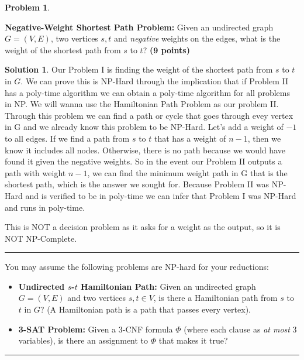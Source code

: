\documentclass{article}
\theoremstyle{definition}
\newtheorem{problem}{Problem}
\def\fline{\rule{0.75\linewidth}{0.5pt}}
\newcommand{\finishline}{\begin{center}\fline\end{center}}
\newtheorem*{solution*}{Solution}
\newenvironment{solution}{\begin{solution*}}{{\finishline} \end{solution*}}
\newcommand{\grade}[1]{\hfill{\textbf{($\mathbf{#1}$ points)}}}
\begin{document}
\begin{problem}
\begin{enumerate}[label=(\alph*)]
	 \item \textbf{Negative-Weight Shortest Path Problem:} Given an undirected graph $G=(V,E)$, two vertices $s,t$ and \emph{negative} weights on the edges, what is the weight of the shortest path from $s$ to $t$? \grade{9}
	 
\begin{solution}
	\item Our Problem I is finding the weight of the shortest path from $s$ to $t$ in $G$. We can prove this is NP-Hard through the implication that if Problem II has a poly-time algorithm we can obtain a poly-time algorithm for all problems in NP. We will wanna use the Hamiltonian Path Problem as our problem II. Through this problem we can find a path or cycle that goes through evey vertex in G and we already know this problem to be NP-Hard. Let's add a weight of $-1$ to all edges. If we find a path from $s$ to $t$ that has a weight of $n-1$, then we know it includes all nodes. Otherwise, there is no path because we would have found it given the negative weights. So in the event our Problem II outputs a path with weight $n-1$, we can find the minimum weight path in G that is the shortest path, which is the answer we sought for. Because Problem II was NP-Hard and is verified to be in poly-time we can infer that Problem I was NP-Hard and runs in poly-time.
	\item This is NOT a decision problem as it asks for a weight as the output, so it is NOT NP-Complete.
\end{solution}

\end{enumerate}

You may assume the following problems are NP-hard for your reductions: 
\begin{itemize}
	\item \textbf{Undirected $s$-$t$ Hamiltonian Path:} Given an undirected graph $G=(V,E)$ and two vertices $s,t \in V$, is there a Hamiltonian path from $s$ to $t$ in $G$? (A Hamiltonian path is a path that passes every vertex). 
	\item \textbf{3-SAT Problem:} Given a 3-CNF formula $\Phi$  (where each clause as \emph{at most} $3$ variables), is there an assignment to $\Phi$ that makes it true?
\end{itemize}

\end{problem}

\finishline
\end{document}
